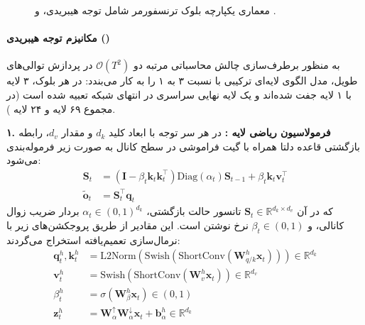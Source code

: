 \begin{figure}[htbp]
{%
}
\caption{معماری یکپارچه بلوک ترنسفورمر  شامل توجه هیبریدی،  و .}
\label{fig:kimi_k3_transformer_architecture}
\end{figure}

\paragraph*{مکانیزم توجه هیبریدی ()}
به منظور برطرف‌سازی چالش محاسباتی مرتبه دو $\mathcal{O}(T^2)$ در پردازش توالی‌های طویل، مدل  الگوی لایه‌ای ترکیبی با نسبت ۳ به ۱ را به کار می‌بندد: در هر بلوک، ۳ لایه  با ۱ لایه  جفت شده‌اند و یک لایه نهایی سراسری  در انتهای شبکه تعبیه شده است (در مجموع ۶۹ لایه  و ۲۴ لایه ).

\textbf{۱. فرمولاسیون ریاضی لایه :}
در هر سر توجه با ابعاد کلید $d_k$ و مقدار $d_v$، رابطه بازگشتی قاعده دلتا \cite{schlag2021linear, yang2025gated} همراه با گیت فراموشی در سطح کانال به صورت زیر فرموله‌بندی می‌شود:
\begin{align}
    \mathbf{S}_t &= \left(\mathbf{I} - \beta_t \mathbf{k}_t \mathbf{k}_t^\top\right) \text{Diag}(\alpha_t) \mathbf{S}_{t-1} + \beta_t \mathbf{k}_t \mathbf{v}_t^\top \\
    \tilde{\mathbf{o}}_t &= \mathbf{S}_t^\top \mathbf{q}_t
\end{align}
که در آن $\mathbf{S}_t \in \mathbb{R}^{d_k \times d_v}$ تانسور حالت بازگشتی، $\alpha_t \in (0, 1)^{d_k}$ بردار ضریب زوال کانالی، و $\beta_t \in (0, 1)$ نرخ نوشتن است. این مقادیر از طریق پروجکشن‌های زیر با نرمال‌سازی تعمیم‌یافته استخراج می‌گردند:
\begin{align}
    \mathbf{q}_t^h, \mathbf{k}_t^h &= \text{L2Norm}\left(\text{Swish}\left(\text{ShortConv}\left(\mathbf{W}_{q/k}^h \mathbf{x}_t\right)\right)\right) \in \mathbb{R}^{d_k} \\
    \mathbf{v}_t^h &= \text{Swish}\left(\text{ShortConv}\left(\mathbf{W}_v^h \mathbf{x}_t\right)\right) \in \mathbb{R}^{d_v} \\
    \beta_t^h &= \sigma\left(\mathbf{W}_\beta^h \mathbf{x}_t\right) \in (0, 1) \\
    \mathbf{z}_t^h &= \mathbf{W}_\alpha^\uparrow \mathbf{W}_\alpha^\downarrow \mathbf{x}_t + \mathbf{b}_\alpha^h \in \mathbb{R}^{d_k}
\end{align}

